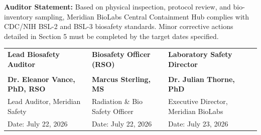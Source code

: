 \documentclass[10pt,a4paper]{scrartcl}
\begin{document}
\begin{tcolorbox}[auditcard]
{\small
\textbf{Auditor Statement:} Based on physical inspection, protocol review, and bio-inventory sampling, Meridian BioLabs Central Containment Hub complies with CDC/NIH BSL-2 and BSL-3 biosafety standards. Minor corrective actions detailed in Section 5 must be completed by the target dates specified.
}

\vspace{8pt}

\begin{tabularx}{\textwidth}{X X X}
    \textbf{Lead Biosafety Auditor} & \textbf{Biosafety Officer (RSO)} & \textbf{Laboratory Safety Director} \\[16pt]
    \underline{\hspace{4.5cm}} & \underline{\hspace{4.5cm}} & \underline{\hspace{4.5cm}} \\
    \textbf{Dr. Eleanor Vance, PhD, RSO} & \textbf{Marcus Sterling, MS} & \textbf{Dr. Julian Thorne, PhD} \\
    Lead Auditor, Meridian Safety & Radiation \& Bio Safety Officer & Executive Director, Meridian BioLabs \\
    Date: July 22, 2026 & Date: July 22, 2026 & Date: July 23, 2026 \\
\end{tabularx}
\end{tcolorbox}
\end{document}

